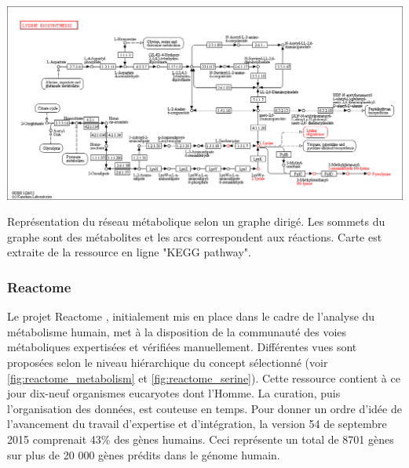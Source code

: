 \begin{refsegment}
    \begin{shadedfigure}[H]
        \centering
        \includegraphics[width=\textwidth]{img/kegg_lysine.png}
        \caption{ Représentation du réseau métabolique selon un graphe dirigé. Les sommets du graphe sont des métabolites et les arcs correspondent aux réactions. Carte est extraite de la ressource en ligne "KEGG pathway". }
        \label{fig:kegg_lysine}
    \end{shadedfigure}
    
    \subsubsection{Reactome}
    Le projet Reactome \cite{joshi2005reactome,matthews2009reactome,croft2010reactome,croft2014reactome,fabregat2016reactome}, initialement mis en place dans le cadre de l'analyse du métabolisme humain, met à la disposition de la communauté des voies métaboliques expertisées et vérifiées manuellement. Différentes vues sont proposées selon le niveau hiérarchique du concept sélectionné (voir \cref{fig:reactome_metabolism} et \cref{fig:reactome_serine}). Cette ressource contient à ce jour dix-neuf organismes eucaryotes dont l'Homme. La curation, puis l'organisation des données, est couteuse en temps. Pour donner un ordre d'idée de l'avancement du travail d'expertise et d'intégration, la version 54 de septembre 2015 comprenait 43\% des gènes humains. Ceci représente un total de 8701 gènes sur plus de 20 000 gènes prédits dans le génome humain.
    

\end{refsegment}
